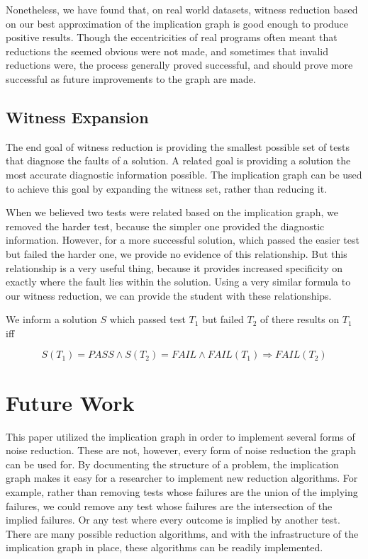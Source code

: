 \documentclass[11pt,twoside]{article}
\begin{document}
Nonetheless, we have found that, on real world datasets, witness reduction based on our best approximation of the implication graph is good enough to produce positive results. Though the eccentricities of real programs often meant that reductions the seemed obvious were not made, and sometimes that invalid reductions were, the process generally proved successful, and should prove more successful as future improvements to the graph are made.

\subsection{Witness Expansion}

The end goal of witness reduction is providing the smallest possible set of tests that diagnose the faults of a solution. A related goal is providing a solution the most accurate diagnostic information possible. The implication graph can be used to achieve this goal by expanding the witness set, rather than reducing it.

When we believed two tests were related based on the implication graph, we removed the harder test, because the simpler one provided the diagnostic information. However, for a more successful solution, which passed the easier test but failed the harder one, we provide no evidence of this relationship. But this relationship is a very useful thing, because it provides increased specificity on exactly where the fault lies within the solution. Using a very similar formula to our witness reduction, we can provide the student with these relationships.

\centerline{We inform a solution $S$ which passed test $T_1$ but failed $T_2$ of there results on  $T_1$ iff}
$$ S(T_1) = PASS \wedge S(T_2) = FAIL \wedge FAIL(T_1) \Rightarrow FAIL(T_2)$$



\section{Future Work}
This paper utilized the implication graph in order to implement several forms of noise reduction. These are not, however, every form of noise reduction the graph can be used for. By documenting the structure of a problem, the implication graph makes it easy for a researcher to implement new reduction algorithms. For example, rather than removing tests whose failures are the union of the implying failures, we could remove any test whose failures are the intersection of the implied failures. Or any test where every outcome is implied by another test. There are many possible reduction algorithms, and with the infrastructure of the implication graph in place, these algorithms can be readily implemented.
\end{document}
